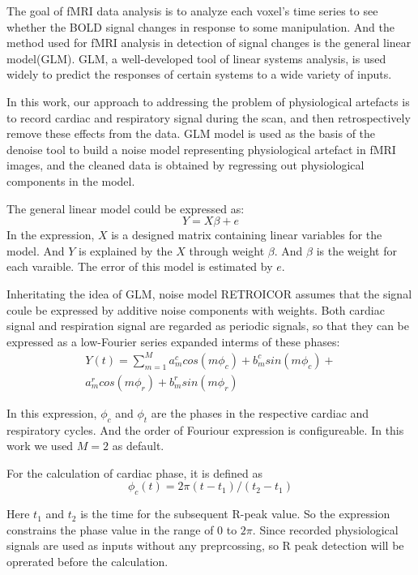 The goal of fMRI data analysis is to analyze each voxel's time series to see whether the BOLD signal changes in response to some manipulation.\cite{poldrack2011handbook} 
And the method used for fMRI analysis in detection of signal changes is the general linear model(GLM). 
GLM, a well-developed tool of linear systems analysis, is used widely to predict the responses of certain systems to a wide variety of inputs.\cite{cohen1997parametric}

In this work, our approach to addressing the problem of physiological artefacts is to record cardiac and respiratory signal during the scan, and then retrospectively remove these effects from the data.\cite{glover2000image} 
GLM model is used as the basis of the denoise tool to build a noise model representing physiological artefact in fMRI images, and the cleaned data is obtained by regressing out physiological components in the model.

The general linear model could be expressed as:
\begin{equation}
    Y = X\beta + e
\end{equation}
In the expression, $X$ is a designed matrix containing linear variables for the model. And $Y$ is explained by the $X$ through weight $\beta$. And $\beta$ is the weight for each varaible. The error of this model is estimated by $e$.

Inheritating the idea of GLM, noise model RETROICOR assumes that the signal coule be expressed by additive noise components with weights. Both cardiac signal and respiration signal are regarded as periodic signals, so that they can be expressed as a low-Fourier series expanded interms of these phases:
\begin{multline}
    Y(t) = \sum_{m = 1}^{M} a_m^c cos(m\phi_c) + b_m^c sin(m\phi_c) + \\ a_m^r cos(m\phi_r) + b_m^r sin(m\phi_r)
\end{multline}

In this expression, $\phi_c$ and $\phi_t$ are the phases in the respective cardiac and respiratory cycles. 
And the order of Fouriour expression is configureable. In this work we used $M = 2$ as default.

For the calculation of cardiac phase, it is defined as
\begin{equation}
\label{eqn:cardiac}
    \phi_c(t) = 2\pi(t-t_1)/(t_2-t_1)
\end{equation}

Here $t_1$ and $t_2$ is the time for the subsequent R-peak value. 
So the expression constrains the phase value in the range of $0$ to $2\pi$. 
Since recorded physiological signals are used as inputs without any preprcossing, so R peak detection will be oprerated before the calculation.

